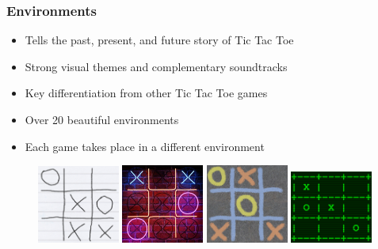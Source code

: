 \documentclass{beamer}
\begin{document}
\begin{frame}
  \frametitle{Environments}

  \begin{itemize}
    \item Tells the past, present, and future story of Tic Tac Toe
    \item Strong visual themes and complementary soundtracks
    \item Key differentiation from other Tic Tac Toe games
    \item Over 20 beautiful environments
    \item Each game takes place in a different environment
  \end{itemize}

  \begin{figure}
    \vspace{1em}
    \includegraphics[width=0.24\textwidth]{img/concept-art/paper}
    \includegraphics[width=0.24\textwidth]{img/concept-art/neon}
    \includegraphics[width=0.24\textwidth]{img/concept-art/sidewalk}
    \includegraphics[width=0.24\textwidth]{img/concept-art/computer}
  \end{figure}

\end{frame}
\end{document}
